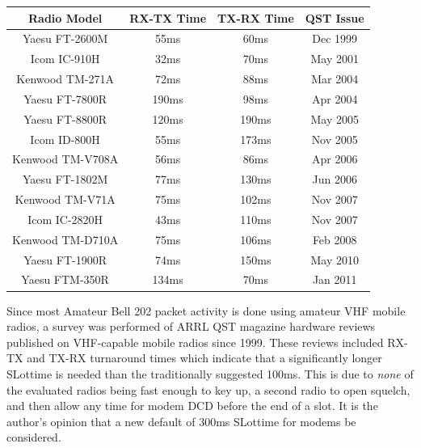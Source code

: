 \documentclass[12pt,letterpaper]{article}
\begin{document}
\begin{center}
\begin{tabular}{ | c || c | c || c |}
	\hline
	Radio Model & RX-TX Time & TX-RX Time & QST Issue \\ \hline
	Yaesu FT-2600M & 55ms & 60ms & Dec 1999 \\ \hline
	Icom IC-910H & 32ms & 70ms & May 2001 \\ \hline
	Kenwood TM-271A & 72ms & 88ms & Mar 2004 \\ \hline
	Yaesu FT-7800R & 190ms & 98ms & Apr 2004 \\ \hline
	Yaesu FT-8800R & 120ms & 190ms & May 2005 \\ \hline
	Icom ID-800H & 55ms & 173ms & Nov 2005 \\ \hline
	Kenwood TM-V708A & 56ms & 86ms & Apr 2006 \\ \hline
	Yaesu FT-1802M & 77ms & 130ms & Jun 2006 \\ \hline
	Kenwood TM-V71A & 75ms & 102ms & Nov 2007 \\ \hline
	Icom IC-2820H & 43ms & 110ms & Nov 2007 \\ \hline
	Kenwood TM-D710A & 75ms & 106ms & Feb 2008 \\ \hline
	Yaesu FT-1900R & 74ms & 150ms & May 2010 \\ \hline
	Yaesu FTM-350R & 134ms & 70ms & Jan 2011 \\ \hline

\end{tabular}
\end{center}

Since most Amateur Bell 202 packet activity is done using amateur VHF mobile radios,
a survey was performed of ARRL QST magazine hardware reviews published on VHF-capable
mobile radios since 1999.
These reviews included RX-TX and TX-RX turnaround times
which indicate that a significantly longer SLottime is needed than the 
traditionally suggested 100ms. 
This is due to \emph{none} of the evaluated radios
being fast enough to key up, a second radio to open squelch, 
and then allow any time for modem DCD before the end of a slot.
It is the author's opinion that a new default of 300ms SLottime 
for modems be considered.
\end{document}
